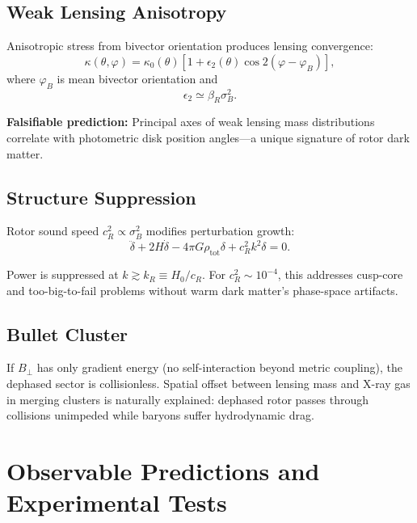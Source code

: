\documentclass[11pt,a4paper]{article}
\numberwithin{equation}{section}
\theoremstyle{plain}
\theoremstyle{definition}
\theoremstyle{remark}
\begin{document}
\subsection{Weak Lensing Anisotropy}

Anisotropic stress from bivector orientation produces lensing convergence:
\begin{equation}
\kappa(\theta,\varphi) = \kappa_0(\theta)\left[1 + \epsilon_2(\theta)\cos 2(\varphi - \varphi_B)\right],
\label{eq:lensing-quadrupole}
\end{equation}
where $\varphi_B$ is mean bivector orientation and
\begin{equation}
\epsilon_2 \simeq \beta_R\sigma_B^2.
\end{equation}

\textbf{Falsifiable prediction:} Principal axes of weak lensing mass distributions correlate with photometric disk position angles—a unique signature of rotor dark matter.

\subsection{Structure Suppression}

Rotor sound speed $c_R^2 \propto \sigma_B^2$ modifies perturbation growth:
\begin{equation}
\ddot{\delta} + 2H\dot{\delta} - 4\pi G\rho_{\mathrm{tot}}\delta + c_R^2 k^2\delta = 0.
\end{equation}

Power is suppressed at $k \gtrsim k_R \equiv H_0/c_R$. For $c_R^2 \sim 10^{-4}$, this addresses cusp-core and too-big-to-fail problems without warm dark matter's phase-space artifacts.

\subsection{Bullet Cluster}

If $B_\perp$ has only gradient energy (no self-interaction beyond metric coupling), the dephased sector is collisionless. Spatial offset between lensing mass and X-ray gas in merging clusters is naturally explained: dephased rotor passes through collisions unimpeded while baryons suffer hydrodynamic drag.

\section{Observable Predictions and Experimental Tests}
\label{sec:predictions}
\end{document}

